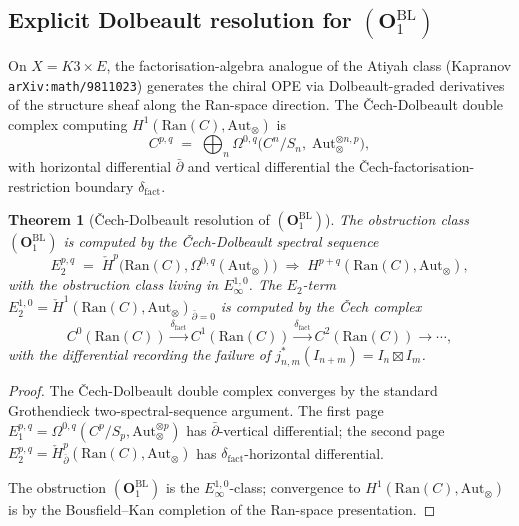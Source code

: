 \documentclass[11pt]{amsart}
\newtheorem{theorem}{Theorem}[section]
\newcommand{\Ran}{\mathrm{Ran}}
\begin{document}
\subsection{Explicit Dolbeault resolution for $(\mathbf{O}_1^{\mathrm{BL}})$}

On $X = K3 \times E$, the factorisation-algebra analogue of the
Atiyah class (Kapranov \texttt{arXiv:math/9811023}) generates the
chiral OPE via Dolbeault-graded derivatives of the structure sheaf
along the Ran-space direction. The \v{C}ech-Dolbeault double complex
computing $H^1(\Ran(C), \mathrm{Aut}_\otimes)$ is
\[
C^{p,q} \;=\; \bigoplus_n
\Omega^{0,q}\bigl(C^n/S_n,\; \mathrm{Aut}_\otimes^{\otimes n,p}\bigr),
\]
with horizontal differential $\bar\partial$ and vertical differential
the \v{C}ech-factorisation-restriction boundary $\delta_{\mathrm{fact}}$.

\begin{theorem}[\v{C}ech-Dolbeault resolution of $(\mathbf{O}_1^{\mathrm{BL}})$]
\label{thm:O1-cech-dolbeault}
The obstruction class $(\mathbf{O}_1^{\mathrm{BL}})$ is computed by the
\v{C}ech-Dolbeault spectral sequence
\[
E_2^{p,q} \;=\;
\check{H}^p\bigl(\Ran(C), \Omega^{0,q}(\mathrm{Aut}_\otimes)\bigr)
\;\Rightarrow\;
H^{p+q}(\Ran(C), \mathrm{Aut}_\otimes),
\]
with the obstruction class living in $E_\infty^{1, 0}$. The
$E_2$-term $E_2^{1, 0} = \check{H}^1(\Ran(C),
\mathrm{Aut}_\otimes)_{\bar\partial=0}$ is computed by the Čech
complex
\[
C^0(\Ran(C)) \xrightarrow{\delta_{\mathrm{fact}}} C^1(\Ran(C))
\xrightarrow{\delta_{\mathrm{fact}}} C^2(\Ran(C)) \to \cdots,
\]
with the differential recording the failure of
$j^*_{n, m}(I_{n+m}) = I_n \boxtimes I_m$.
\end{theorem}

\begin{proof}
The \v{C}ech-Dolbeault double complex converges by the standard
Grothendieck two-spectral-sequence argument. The first
page $E_1^{p, q} = \Omega^{0, q}(C^p/S_p, \mathrm{Aut}_\otimes^{\otimes p})$
has $\bar\partial$-vertical differential; the second page
$E_2^{p, q} = \check{H}^p_{\bar\partial}(\Ran(C),
\mathrm{Aut}_\otimes)$ has
$\delta_{\mathrm{fact}}$-horizontal differential.

The obstruction $(\mathbf{O}_1^{\mathrm{BL}})$ is the
$E_\infty^{1, 0}$-class; convergence to $H^1(\Ran(C),
\mathrm{Aut}_\otimes)$ is by the Bousfield--Kan completion of
the Ran-space presentation.
\end{proof}
\end{document}
